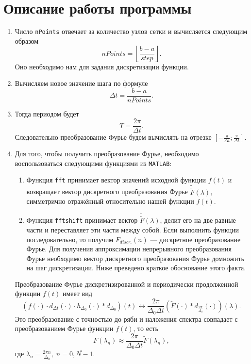\documentclass[a4paper, 11pt]{article}
\begin{document}
\section{Описание работы программы}
    \begin{enumerate}
        \item
            Число \texttt{nPoints} отвечает за количество узлов сетки и вычисляется следующим образом
            $$
                nPoints = \left \lfloor \frac{b-a}{step} \right \rfloor.        
            $$
            Оно необходимо нам для задания дискретизации функции.
        \item
            Вычисляем новое значение шага по формуле
            $$
                \Delta t = \frac{b-a}{nPoints}.
            $$
        \item
            Тогда периодом будет
            $$
                T = \frac{2\pi}{\Delta t}.            
            $$
            Следовательно преобразование Фурье будем вычислять на отрезке $\left[ -\frac{\pi}{\Delta t}; \frac{\pi}{\Delta t} \right]$.
        \item
            Для того, чтобы получить преобразование Фурье, необходимо воспользоваться следующими функциями из \texttt{MATLAB}:
            \begin{enumerate}
                \item
                    Функция \texttt{fft} принимает вектор значений исходной функции $f(t)$ и возвращает вектор дискретного преобразования Фурье $\widetilde{\widetilde{F}}(\lambda)$, симметрично отражённый относительно нашей функции $f(t)$.
                \item
                    Функция \texttt{fftshift} принимает вектор $\widetilde{\widetilde{F}}(\lambda)$, делит его на две равные части и переставляет эти части между собой. Если выполнить функции последовательно, то получим $F_{discr.}(n)$ --- дискретное преобразование Фурье. Для получения аппроксимации непрерывного преобразования Фурье необходимо вектор дискретного преобразования Фурье домножить на шаг дискретизации. Ниже преведено краткое обоснование этого факта.%
            \end{enumerate}
	        Преобразование Фурье дискретизированной и периодически продолженной функции $f(t)$ имеет вид
            $$
                (f(\cdot)\cdot d_{\Delta t}(\cdot)\cdot h_{\Delta_0}(\cdot) * d_{\Delta_0})(t) \longleftrightarrow \frac{2\pi}{\Delta_0 \Delta t}(\widetilde{F}(\cdot) * d_{\frac{2\pi}{\Delta_0}}(\cdot))(\lambda).
            $$
            Это преобразование с точностью до ряби и наложения спектра совпадает с преобразованием Фурье функции $f(t)$, то есть
            $$
                F(\lambda_n) \approx \frac{2\pi}{\Delta_0\Delta t} \widetilde{F}(\lambda_n),
            $$
            где $\lambda_n = \frac{2\pi n}{\Delta_0},\; n = \overline{0, N-1}$.


\end{enumerate}
\end{document}
